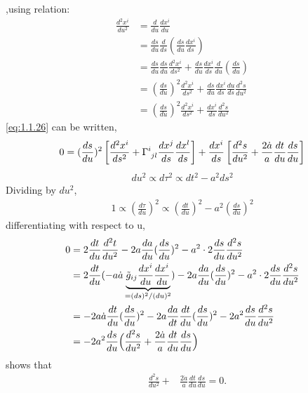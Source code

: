 \documentclass[11pt]{ltjsarticle}
\theoremstyle{plain}
\theoremstyle{break}
\newcommand{\tilg}{\tilde{g}}
\newcommand{\tensorGamma}[1]{\tensor{\Gamma}{ #1}}
\begin{document}
,using relation:
\begin{align}
\frac{d^2 x^i}{du^2}
&= \frac{d}{du} \frac{dx^i}{du} \\
&=\frac{ds}{du} \frac{d}{ds} (\frac{ds}{du} \frac{dx^i}{ds} )\\
&=\frac{ds}{du}\frac{ds}{du}\frac{d^2 x^i}{ds^2} +\frac{ds}{du} \frac{dx^i}{ds}\frac{d}{du} (\frac{ds}{du}) \\
&=(\frac{ds}{du})^2 \frac{d^2x^i}{ds^2} + \frac{ds}{du}\frac{dx^i}{ds}\frac{du}{ds} \frac{d^2s}{du^2} \\
&=(\frac{ds}{du})^2 \frac{d^2x^i}{ds^2} + \frac{dx^i}{ds} \frac{d^2s}{du^2}
\end{align}%
\eqref{eq:1.1.26} can be written,
\begin{align}
0 = (\frac{ds}{du})^2 \left[ \frac{d^2 x^i}{ds^2} + \tensorGamma{^i_{jl}} \frac{dx^j}{ds}\frac{dx^l}{ds} \right] + \frac{dx^i}{ds} \left[ \frac{d^2 s}{du^2} + \frac{2 \dot{a}}{a} \frac{dt}{du}\frac{ds}{du} \right]
\end{align}%
\begin{align}
du^2 \propto d\tau^2 \propto dt^2 - a^2 ds^2
\end{align}%
Dividing by $du^2$,
\begin{align}
1
\propto (\frac{d\tau}{du})^2
\propto (\frac{dt}{du})^2 -a^2 (\frac{ds}{du})^2
\end{align}%
 differentiating with respect to u,
\begin{align}
0
&= 2\frac{dt}{du} \frac{d^2t}{du^2}
      - 2a \frac{da}{du}  (\frac{ds}{du})^2 - a^2 \cdot 2\frac{ds}{du} \frac{d^2 s}{du^2} \\
&= 2\frac{dt}{du} (- a \dot{a} \underbrace{\tilg_{ij} \frac{dx^i}{du}\frac{dx^i}{du} }_{= (ds)^2/(du)^2} )
      - 2a \frac{da}{du}  (\frac{ds}{du})^2 - a^2 \cdot 2\frac{ds}{du} \frac{d^2 s}{du^2} \\
&=-2 a \dot{a} \frac{dt}{du} (\frac{ds}{du})^2  - 2 a \frac{da}{dt} \frac{dt}{du} (\frac{ds}{du})^2 -2a^2 \frac{ds}{du} \frac{d^2 s}{du^2}\\
&=-2 a^2 \frac{ds}{du} \Bigl( \frac{d^2s}{du^2} + \frac{2\dot{a}}{a} \frac{dt}{du} \frac{ds}{du}\Bigr)
\end{align}
shows that
\begin{align}
\quad \frac{d^2s}{du^2} + &\frac{2 \dot{a}}{a} \frac{dt}{du} \frac{ds}{du} = 0.
\end{align}%
\end{document}

